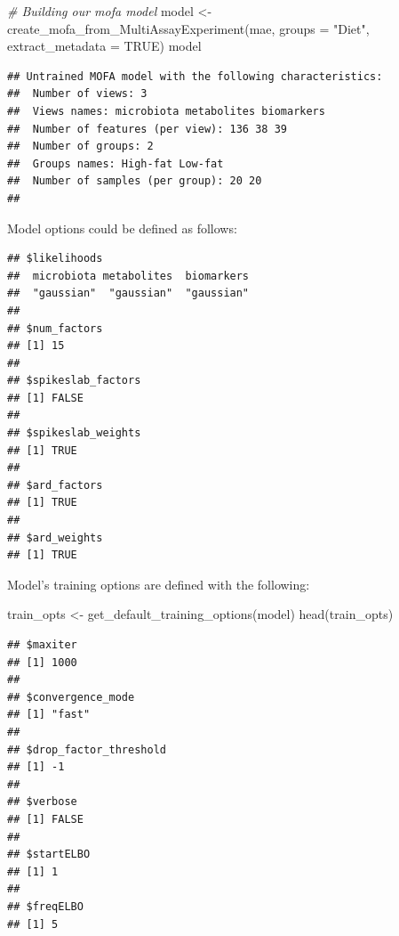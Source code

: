 \documentclass[
]{book}
\newenvironment{Shaded}{\begin{snugshade}}{\end{snugshade}}
\newcommand{\AttributeTok}[1]{\textcolor[rgb]{0.77,0.63,0.00}{#1}}
\newcommand{\CommentTok}[1]{\textcolor[rgb]{0.56,0.35,0.01}{\textit{#1}}}
\newcommand{\ConstantTok}[1]{\textcolor[rgb]{0.00,0.00,0.00}{#1}}
\newcommand{\DecValTok}[1]{\textcolor[rgb]{0.00,0.00,0.81}{#1}}
\newcommand{\FunctionTok}[1]{\textcolor[rgb]{0.00,0.00,0.00}{#1}}
\newcommand{\NormalTok}[1]{#1}
\newcommand{\OtherTok}[1]{\textcolor[rgb]{0.56,0.35,0.01}{#1}}
\newcommand{\SpecialCharTok}[1]{\textcolor[rgb]{0.00,0.00,0.00}{#1}}
\newcommand{\StringTok}[1]{\textcolor[rgb]{0.31,0.60,0.02}{#1}}
\begin{document}
\begin{Shaded}
\begin{Highlighting}[]
\CommentTok{\# Building our mofa model}
\NormalTok{model }\OtherTok{\textless{}{-}} \FunctionTok{create\_mofa\_from\_MultiAssayExperiment}\NormalTok{(mae,}
                                               \AttributeTok{groups =} \StringTok{"Diet"}\NormalTok{, }
                                               \AttributeTok{extract\_metadata =} \ConstantTok{TRUE}\NormalTok{)}
\NormalTok{model}
\end{Highlighting}
\end{Shaded}

\begin{verbatim}
## Untrained MOFA model with the following characteristics: 
##  Number of views: 3 
##  Views names: microbiota metabolites biomarkers 
##  Number of features (per view): 136 38 39 
##  Number of groups: 2 
##  Groups names: High-fat Low-fat 
##  Number of samples (per group): 20 20 
## 
\end{verbatim}

Model options could be defined as follows:

\begin{Shaded}
\end{Shaded}

\begin{verbatim}
## $likelihoods
##  microbiota metabolites  biomarkers 
##  "gaussian"  "gaussian"  "gaussian" 
## 
## $num_factors
## [1] 15
## 
## $spikeslab_factors
## [1] FALSE
## 
## $spikeslab_weights
## [1] TRUE
## 
## $ard_factors
## [1] TRUE
## 
## $ard_weights
## [1] TRUE
\end{verbatim}

Model's training options are defined with the following:

\begin{Shaded}
\begin{Highlighting}[]
\NormalTok{train\_opts }\OtherTok{\textless{}{-}} \FunctionTok{get\_default\_training\_options}\NormalTok{(model)}
\FunctionTok{head}\NormalTok{(train\_opts)}
\end{Highlighting}
\end{Shaded}

\begin{verbatim}
## $maxiter
## [1] 1000
## 
## $convergence_mode
## [1] "fast"
## 
## $drop_factor_threshold
## [1] -1
## 
## $verbose
## [1] FALSE
## 
## $startELBO
## [1] 1
## 
## $freqELBO
## [1] 5
\end{verbatim}
\end{document}
